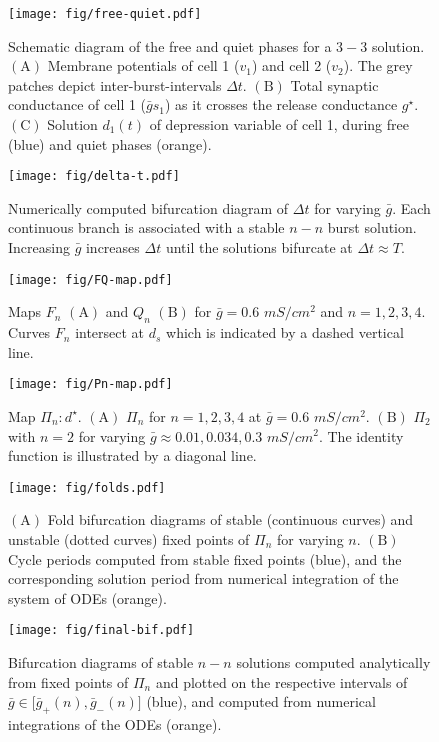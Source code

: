 \documentclass[utf8]{frontiersFPHY} %
\newcommand{\gbar}{\bar g}
\newcommand{\delt}{\Delta t}
\begin{document}
\begin{figure}[h!]
  \centering
  \texttt{[image: fig/free-quiet.pdf]}
  \caption{Schematic diagram of the free and quiet phases for a $3-3$ solution. $\bm{\mathrm{(A)}}$ Membrane potentials of cell 1 ($v_{1}$) and cell 2 ($v_{2}$).  The grey patches depict inter-burst-intervals $\delt$. $\bm{\mathrm{(B)}}$ Total synaptic conductance of cell 1 ($\gbar s_1$) as it crosses the release conductance $g^{\star}$. $\bm{\mathrm{(C)}}$ Solution $d_1(t)$ of depression variable of cell 1, during free (blue) and quiet phases (orange).~\label{fig:free-quiet1}}
\end{figure}

\begin{figure}[h!]
  \centering
  \texttt{[image: fig/delta-t.pdf]}
  \caption{Numerically computed bifurcation diagram of $\delt$ for varying $\gbar$. Each continuous branch is associated with a stable $n-n$ burst solution. Increasing $\gbar$ increases $\Delta t$ until the solutions bifurcate at $\Delta t\approx T$.~\label{fig:delta-t}}
\end{figure}

\begin{figure}[h!]
  \centering
  \texttt{[image: fig/FQ-map.pdf]}
  \caption{Maps $F_n$ $\bm{\mathrm{(A)}}$ and $Q_n$ $\bm{\mathrm{(B)}}$ for $\gbar=0.6$ $\si{mS/cm^{2}}$ and $n=1,2,3,4$. Curves $F_n$ intersect at $d_{s}$ which is indicated by a dashed vertical line.~\label{fig:FQ-map}}
\end{figure}

\begin{figure}[h!]
  \centering
  \texttt{[image: fig/Pn-map.pdf]}
  \caption{Map $\Pi_{n}:d^{\star}$. $\bm{\mathrm{(A)}}$ $\Pi_{n}$ for $n=1,2,3,4$ at $\gbar=0.6$ $\si{mS/cm^{2}}$. $\bm{\mathrm{(B)}}$ $\Pi_{2}$ with $n=2$ for varying $\gbar \approx 0.01, 0.034, 0.3$ $\si{mS/cm^{2}}$. The identity function is illustrated by a diagonal line.~\label{fig:Pn-map}}
\end{figure}

\begin{figure}[h!]
  \centering
  \texttt{[image: fig/folds.pdf]}
  \caption{$\bm{\mathrm{(A)}}$ Fold bifurcation diagrams of stable (continuous curves) and unstable (dotted curves) fixed points of $\Pi_{n}$ for varying $n$. $\bm{\mathrm{(B)}}$ Cycle periods computed from stable fixed points (blue), and the corresponding solution period from numerical integration of the system of ODEs (orange).~\label{fig:folds}}
\end{figure}

\begin{figure}[h!]
  \centering
  \texttt{[image: fig/final-bif.pdf]}
  \caption{Bifurcation diagrams of stable $n-n$ solutions computed analytically from fixed points of $\Pi_n$ and plotted on the respective intervals of $\gbar\in \big[\gbar_+(n),\gbar_-(n)\big]$ (blue), and computed from numerical integrations of the ODEs (orange).~\label{fig:final-bif}}
\end{figure}
\end{document}
